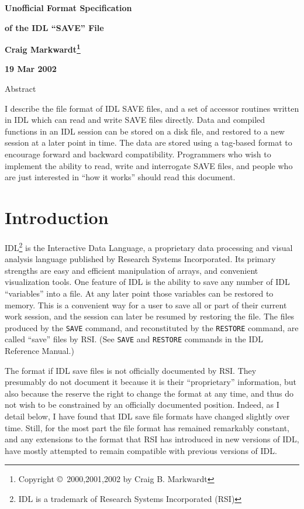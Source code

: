 \documentclass[12pt]{article}
\begin{document}
\centerline{\bf\huge Unofficial Format Specification}
\centerline{\bf\huge of the IDL ``SAVE'' File}
\bigskip
\centerline{\bf Craig Markwardt\footnote{Copyright \copyright\ 2000,2001,2002 by Craig B. Markwardt}}
\smallskip
\centerline{\bf 19 Mar 2002}
\bigskip
\begin{center}
\begin{minipage}{4.5in}
\centerline{Abstract}
\bigskip
I describe the file format of IDL SAVE files, and a set of accessor
routines written in IDL which can read and write SAVE files directly.
Data and compiled functions in an IDL session can be stored on a disk
file, and restored to a new session at a later point in time.  The
data are stored using a tag-based format to encourage forward and
backward compatibility.  Programmers who wish to implement the ability
to read, write and interrogate SAVE files, and people who are just
interested in ``how it works'' should read this document.
\end{minipage}
\end{center}

\section{Introduction\label{s:intro}}

IDL\footnote{IDL is a trademark of Research Systems Incorporated
(RSI)} is the Interactive Data Language, a proprietary data processing
and visual analysis language published by Research Systems
Incorporated.  Its primary strengths are easy and efficient
manipulation of arrays, and convenient visualization tools.  One
feature of IDL is the ability to save any number of IDL ``variables''
into a file.  At any later point those variables can be restored to
memory.  This is a convenient way for a user to save all or part of
their current work session, and the session can later be resumed by
restoring the file.  The files produced by the {\tt SAVE} command, and
reconstituted by the {\tt RESTORE} command, are called ``save'' files
by RSI.  (See {\tt SAVE} and {\tt RESTORE} commands in the IDL
Reference Manual.)

The format if IDL save files is not officially documented by RSI.
They presumably do not document it because it is their ``proprietary''
information, but also because the reserve the right to change the
format at any time, and thus do not wish to be constrained by an
officially documented position.  Indeed, as I detail below, I have
found that IDL save file formats have changed slightly over time.
Still, for the most part the file format has remained remarkably
constant, and any extensions to the format that RSI has introduced in
new versions of IDL, have mostly attempted to remain compatible with
previous versions of IDL.
\end{document}

